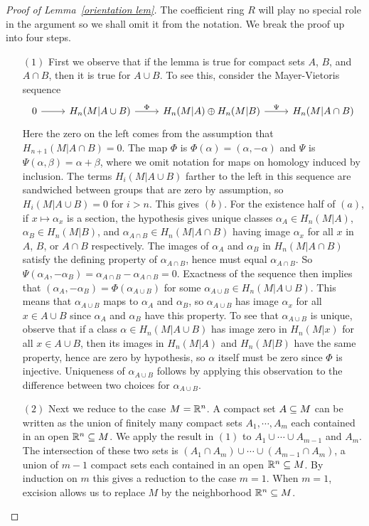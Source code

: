 \begin{proof}[Proof of Lemma~\ref{orientation lem}]
The coefficient ring $R$ will play no special role in the argument so we shall omit it from the notation. We break the proof up into four steps.\par
\begin{itemize}
\item[$(1)$]First we observe that if the lemma is true for compact sets $A$, $B$, and $A\cap B$, then it is true for $A\cup B$. To see this, consider the Mayer-Vietoris sequence 
\[\begin{tikzcd}
0\ar[r]&H_n(M|A\cup B)\ar[r,"\Phi"]&H_n(M|A)\oplus H_n(M|B)\ar[r,"\Psi"]&H_n(M|A\cap B)
\end{tikzcd}\]
Here the zero on the left comes from the assumption that $H_{n+1}(M|A\cap B)=0$. The map $\Phi$ is $\Phi(\alpha)=(\alpha,-\alpha)$ and $\Psi$ is $\Psi(\alpha,\beta)=\alpha+\beta$, where we omit notation for maps on homology induced by inclusion. The terms $H_i(M|A\cup B)$ farther to the left
in this sequence are sandwiched between groups that are zero by assumption, so
$H_i(M|A\cup B)=0$ for $i>n$. This gives $(b)$. For the existence half of $(a)$, if $x\mapsto\alpha_x$ is a section, the hypothesis gives unique classes $\alpha_A\in H_n(M|A)$, $\alpha_B\in H_n(M|B)$, and $\alpha_{A\cap B}\in H_n(M|A\cap B)$ having image $\alpha_x$ for all $x$ in $A$, $B$, or $A\cap B$ respectively. The images of $\alpha_A$ and $\alpha_B$ in $H_n(M|A\cap B)$ satisfy the defining property of $\alpha_{A\cap B}$, hence
must equal $\alpha_{A\cap B}$. So $\Psi(\alpha_A,-\alpha_B)=\alpha_{A\cap B}-\alpha_{A\cap B}=0$. Exactness of the sequence then implies that $(\alpha_A,-\alpha_B)=\Phi(\alpha_{A\cup B})$ for some $\alpha_{A\cup B}\in H_n(M|A\cup B)$. This means that $\alpha_{A\cup B}$ maps to $\alpha_A$ and $\alpha_B$, so $\alpha_{A\cup B}$ has image $\alpha_x$ for all $x\in A\cup B$ since $\alpha_A$ and $\alpha_B$ have this property. To see that $\alpha_{A\cup B}$ is unique, observe that if a class $\alpha\in H_n(M|A\cup B)$ has image zero in $H_n(M|x)$ for all $x\in A\cup B$, then its images in $H_n(M|A)$ and $H_n(M|B)$ have the same property, hence are zero by hypothesis, so $\alpha$ itself must be zero since $\Phi$ is injective. Uniqueness of $\alpha_{A\cup B}$ follows by applying this observation to the difference between two choices for $\alpha_{A\cup B}$.
\item[$(2)$]Next we reduce to the case $M=\mathbb{R}^n$. A compact set $A\subseteq M$ can be written as the union of finitely many compact sets $A_1,\cdots,A_m$ each contained in an open $\mathbb{R}^n\subseteq M$. We apply the result in $(1)$ to $A_1\cup\cdots\cup A_{m-1}$ and $A_m$. The intersection of these two sets is $(A_1\cap A_m)\cup\cdots\cup(A_{m-1}\cap A_m)$, a union of $m-1$ compact sets each contained in an open $\mathbb{R}^n\subseteq M$. By induction on $m$ this gives a reduction to the case $m=1$. When $m=1$, excision allows us to replace $M$ by the neighborhood $\mathbb{R}^n\subseteq M$.

\end{itemize}
\end{proof}
